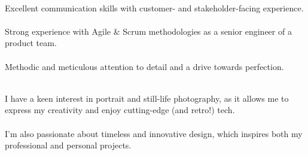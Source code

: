 \documentclass[8pt]{developercv} %
\begin{document}
\vspace{0.5cm}
\begin{minipage}[t]{0.45\textwidth}
	\vspace{-\baselineskip} %

	\\
	Excellent communication skills with customer- and stakeholder-facing experience.\\\\Strong experience with Agile \& Scrum methodologies as a senior engineer of a product team.\\\\Methodic and meticulous attention to detail and a drive towards perfection.
\end{minipage}
\hfill
\begin{minipage}[t]{0.45\textwidth}
	\vspace{-\baselineskip} %
	
	\\
	 I have a keen interest in portrait and still-life photography, as it allows me to express my creativity and enjoy cutting-edge (and retro!) tech.\\\\I'm also passionate about timeless and innovative design, which inspires both my professional and personal projects.
\end{minipage}


\end{document}
